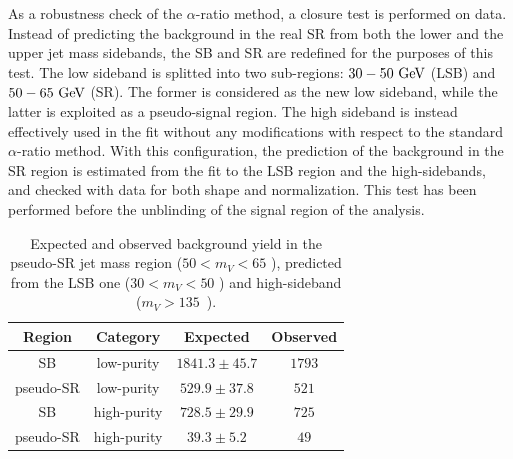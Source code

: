 \vspace*{1\baselineskip}

\noindent As a robustness check of the $\alpha$-ratio method, a closure test is performed on data. Instead of predicting the background in the real SR from both the lower and the upper jet mass sidebands, the SB and SR are redefined for the purposes of this test. The low sideband is splitted into two sub-regions: $30-50~\text{GeV}$ (LSB) and $50-65~\text{GeV}$ (SR). The former is considered as the new low sideband, while the latter is exploited as a pseudo-signal region. The high sideband is instead effectively used in the fit without any modifications with respect to the standard $\alpha$-ratio method. With this configuration, the prediction of the background in the SR region is estimated from the fit to the LSB region and the high-sidebands, and checked with data for both shape and normalization. This test has been performed before the unblinding of the signal region of the analysis.

\begin{table}[!htb]
  \begin{center}
  \caption{Expected and observed background yield in the pseudo-SR jet mass region ($ 50 < m_V < 65$ \GeV), predicted from the LSB one ($30 < m_V < 50$ \GeV) and high-sideband ($m_V > 135$~\GeV).}\label{tab:alphaClosure}
    \begin{tabular}{cc|cc}
      Region & Category & Expected & Observed \\
      \hline
      \hline
      SB & low-purity & $1841.3 \pm 45.7$ & $1793$ \\
      pseudo-SR & low-purity & $529.9 \pm 37.8$ & $521$ \\
      \hdashline
      SB & high-purity & $728.5 \pm 29.9$ & $725$ \\
      pseudo-SR & high-purity & $39.3 \pm 5.2$ & $49$ \\
    \end{tabular}
  \end{center}

\end{table}

